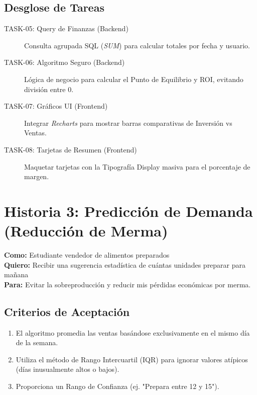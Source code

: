 \documentclass[11pt, letterpaper]{article}
\begin{document}
    \subsection{Desglose de Tareas}
    \begin{description}
        \item[TASK-05: Query de Finanzas (Backend)] Consulta agrupada SQL (\textit{SUM}) para calcular totales por fecha y usuario.
        \item[TASK-06: Algoritmo Seguro (Backend)] Lógica de negocio para calcular el Punto de Equilibrio y ROI, evitando división entre 0.
        \item[TASK-07: Gráficos UI (Frontend)] Integrar \textit{Recharts} para mostrar barras comparativas de Inversión vs Ventas.
        \item[TASK-08: Tarjetas de Resumen (Frontend)] Maquetar tarjetas con la Tipografía Display masiva para el porcentaje de margen.
    \end{description}

    \newpage

    \section{Historia 3: Predicción de Demanda (Reducción de Merma)}

    \begin{tcolorbox}[colback=green!5!white,colframe=green!50!black,title=HU-03: Recomendación de Preparación]
        \textbf{Como:} Estudiante vendedor de alimentos preparados \\
        \textbf{Quiero:} Recibir una sugerencia estadística de cuántas unidades preparar para mañana \\
        \textbf{Para:} Evitar la sobreproducción y reducir mis pérdidas económicas por merma.
    \end{tcolorbox}

    \subsection{Criterios de Aceptación}
    \begin{enumerate}[label=\bfseries\arabic*.]
        \item El algoritmo promedia las ventas basándose exclusivamente en el mismo día de la semana.
        \item Utiliza el método de Rango Intercuartil (IQR) para ignorar valores atípicos (días inusualmente altos o bajos).
        \item Proporciona un Rango de Confianza (ej. "Prepara entre 12 y 15").
    \end{enumerate}
\end{document}
